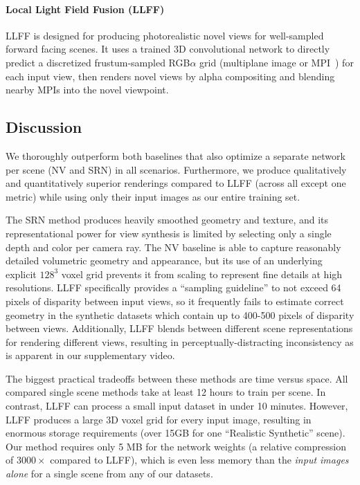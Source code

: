 \documentclass[runningheads]{llncs}
\begin{document}
\paragraph{\textbf{Local Light Field Fusion (LLFF)}~\cite{mildenhall19}}
LLFF is designed for producing photorealistic novel views for well-sampled forward facing scenes. It uses a trained 3D convolutional network to directly predict a discretized frustum-sampled RGB$\alpha$ grid (multiplane image or MPI~\cite{zhou18}) for each input view, then renders novel views by alpha compositing and blending nearby MPIs into the novel viewpoint. 


\subsection{Discussion}

We thoroughly outperform both baselines that also optimize a separate network per scene (NV and SRN) in all scenarios.
Furthermore, we produce qualitatively and quantitatively superior renderings compared to LLFF (across all except one metric) while using only their input images as our entire training set.

The SRN method produces heavily smoothed geometry and texture, and its representational power for view synthesis is limited by selecting only a single depth and color per camera ray. The NV baseline is able to capture reasonably detailed volumetric geometry and appearance, but its use of an underlying explicit $128^3$ voxel grid prevents it from scaling to represent fine details at high resolutions. LLFF specifically provides a ``sampling guideline'' to not exceed 64 pixels of disparity between input views, so it frequently fails to estimate correct geometry in the synthetic datasets which contain up to 400-500 pixels of disparity between views. Additionally, LLFF blends between different scene representations for rendering different views, resulting in perceptually-distracting inconsistency as is apparent in our supplementary video. 

The biggest practical tradeoffs between these methods are time versus space. All compared single scene methods take at least 12 hours to train per scene. In contrast, LLFF can process a small input dataset in under 10 minutes. However, LLFF produces a large 3D voxel grid for every input image, resulting in enormous storage requirements (over 15GB for one ``Realistic Synthetic'' scene). Our method requires only 5 MB for the network weights (a relative compression of $3000\times$ compared to LLFF), which is even less memory than the \emph{input images alone} for a single scene from any of our datasets.
\end{document}

